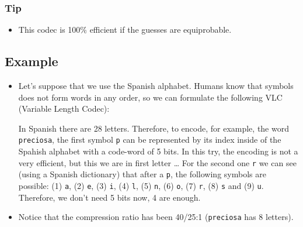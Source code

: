 \subsubsection{Tip}
\begin{itemize}
\tightlist
\item
  This codec is 100\% efficient if the guesses are equiprobable.
\end{itemize}
\subsection{Example}
\begin{itemize}
\item
  Let's suppose that we use the Spanish alphabet. Humans know that
  symbols does not form words in any order, so we can formulate the
  following VLC (Variable Length Codec):

  In Spanish there are 28 letters. Therefore, to encode, for example,
  the word \texttt{preciosa}, the first symbol \texttt{p} can be
  represented by its index inside of the Spahish alphabet with a
  code-word of 5 bits. In this try, the encoding is not a very
  efficient, but this we are in first letter \ldots{} For the second one
  \texttt{r} we can see (using a Spanish dictionary) that after a
  \texttt{p}, the following symbols are possible: (1) \texttt{a}, (2)
  \texttt{e}, (3) \texttt{i}, (4) \texttt{l}, (5) \texttt{n}, (6)
  \texttt{o}, (7) \texttt{r}, (8) \texttt{s} and (9) \texttt{u}.
  Therefore, we don't need 5 bits now, 4 are enough.
\end{itemize}


\begin{itemize}
\tightlist
\item
  Notice that the compression ratio has been 40/25:1 (\texttt{preciosa}
  has 8 letters).
\end{itemize}

\section{}
\section{}
\section{}
